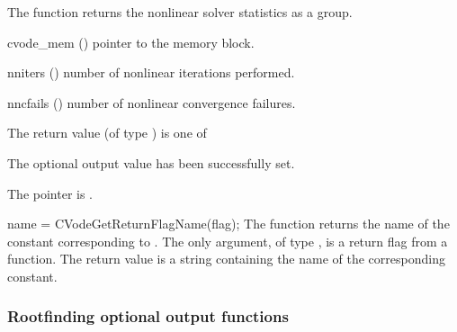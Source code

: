 {
  The function  returns the
  {\cvode} nonlinear solver statistics as a group.
}
{
  \begin{args}
  \item[cvode\_mem] ()
    pointer to the {\cvode} memory block.
  \item[nniters] ()
    number of nonlinear iterations performed.
  \item[nncfails] ()
    number of nonlinear convergence failures.
  \end{args}
}
{
  The return value  (of type ) is one of
  \begin{args}
  \item[\Id{CV\_SUCCESS}] 
    The optional output value has been successfully set.
  \item[\Id{CV\_MEM\_NULL}]
    The  pointer is .
  \end{args}
}
{}
{
  name = CVodeGetReturnFlagName(flag);
}
{
  The function  returns the
  name of the {\cvode} constant corresponding to .
}
{
  The only argument, of type , is a return flag from a {\cvode} function.
}
{
  The return value is a string containing the name of the corresponding constant.
}
{}


\subsubsection{Rootfinding optional output functions}\label{sss:optout_root}

